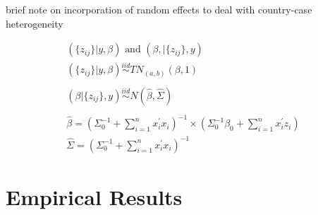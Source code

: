 

brief note on incorporation of random effects to deal with country-case heterogeneity

\begin{eqnarray}
	(\{z_{ij}\} | y,\beta)\text{ and }(\beta,|\{z_{ij}\},y) \nonumber \\
	(\{z_{ij}\} | y,\beta)\stackrel{iid}{\sim}TN_{(a,b)}(\beta,1) \nonumber \\
	\nonumber \\
	(\beta | \{z_{ij}\},y)\stackrel{iid}{\sim}N(\hat{\beta},\hat{\Sigma}) \nonumber \\
	\nonumber \\
	\hat{\beta} = (\Sigma_{0}^{-1}+\sum_{i=1}^{n} x_{i}^{'}x_{i})^{-1} \times (\Sigma_{0}^{-1}\beta_{0}+\sum_{i=1}^{n} x_{i}^{'}z_{i}) \nonumber \\
	\hat{\Sigma} = (\Sigma_{0}^{-1} + \sum_{i=1}^{n} x_{i}^{'}x_{i})^{-1} \nonumber
\end{eqnarray}


\section*{Empirical Results}

